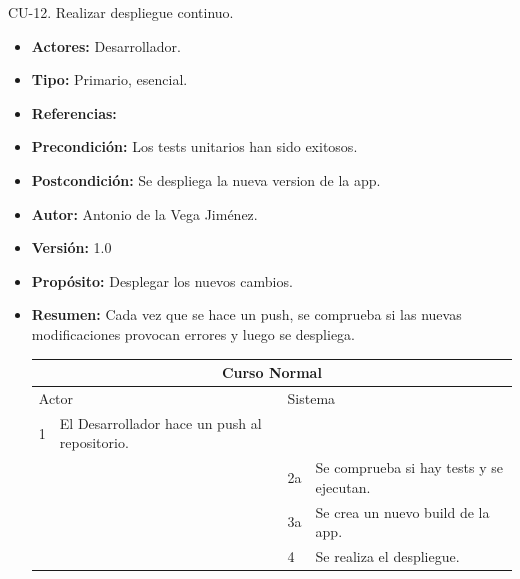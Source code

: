 \item CU-12. Realizar despliegue continuo.
\begin{itemize}
  \item \textbf{Actores:} Desarrollador.
  \item \textbf{Tipo:} Primario, esencial.
  \item \textbf{Referencias:}
  \item \textbf{Precondición:} Los tests unitarios han sido exitosos.
  \item \textbf{Postcondición:} Se despliega la nueva version de la app.
  \item \textbf{Autor:} Antonio de la Vega Jiménez.
  \item \textbf{Versión:} 1.0
  \item \textbf{Propósito:} Desplegar los nuevos cambios.
  \item \textbf{Resumen:} Cada vez que se hace un push, se comprueba si las nuevas modificaciones provocan errores y luego se despliega.
  \begin{table}[H]
    \centering
    \begin{tabularx}{\textwidth}{|l|X|l|X|}
      \hline
      \multicolumn{4}{|c|}{\cellcolor[HTML]{C0C0C0}Curso Normal}                                                 \\ \hline
      \multicolumn{2}{|l|}{\cellcolor[HTML]{EFEFEF}Actor} & \multicolumn{2}{l|}{\cellcolor[HTML]{EFEFEF}Sistema} \\ \hline
      1                         & El Desarrollador hace un push al repositorio.                        &                            &                         \\ \hline
                                &                         & 2a                          & Se comprueba si hay tests  y se ejecutan.                       \\ \hline
                                &                         & 3a                           & Se crea un nuevo build de la app.                       \\ \hline
                                &                         & 4                           & Se realiza el despliegue.                       \\ \hline


\end{tabularx}
\end{table}
\end{itemize}
